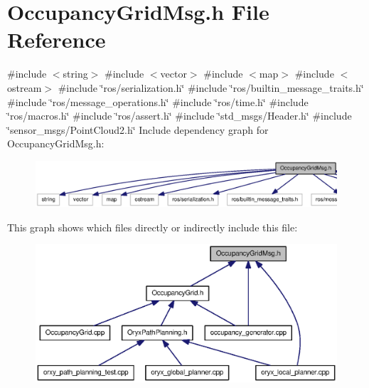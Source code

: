 \section{\-Occupancy\-Grid\-Msg.\-h \-File \-Reference}
\label{OccupancyGridMsg_8h}
{\ttfamily \#include $<$string$>$}\*
{\ttfamily \#include $<$vector$>$}\*
{\ttfamily \#include $<$map$>$}\*
{\ttfamily \#include $<$ostream$>$}\*
{\ttfamily \#include \char`\"{}ros/serialization.\-h\char`\"{}}\*
{\ttfamily \#include \char`\"{}ros/builtin\-\_\-message\-\_\-traits.\-h\char`\"{}}\*
{\ttfamily \#include \char`\"{}ros/message\-\_\-operations.\-h\char`\"{}}\*
{\ttfamily \#include \char`\"{}ros/time.\-h\char`\"{}}\*
{\ttfamily \#include \char`\"{}ros/macros.\-h\char`\"{}}\*
{\ttfamily \#include \char`\"{}ros/assert.\-h\char`\"{}}\*
{\ttfamily \#include \char`\"{}std\-\_\-msgs/\-Header.\-h\char`\"{}}\*
{\ttfamily \#include \char`\"{}sensor\-\_\-msgs/\-Point\-Cloud2.\-h\char`\"{}}\*
\-Include dependency graph for \-Occupancy\-Grid\-Msg.\-h\-:
\nopagebreak
\begin{figure}[H]
\begin{center}
\leavevmode
\includegraphics[width=350pt]{OccupancyGridMsg_8h__incl}
\end{center}
\end{figure}
\-This graph shows which files directly or indirectly include this file\-:
\nopagebreak
\begin{figure}[H]
\begin{center}
\leavevmode
\includegraphics[width=350pt]{OccupancyGridMsg_8h__dep__incl}
\end{center}
\end{figure}
